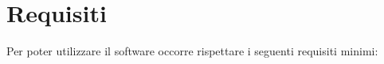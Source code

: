 \section{Requisiti}
Per poter utilizzare il software occorre rispettare i seguenti
requisiti minimi:



